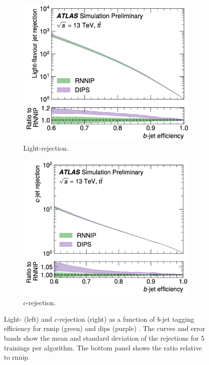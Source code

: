 \begin{figure}[h!]
  \centering
  \begin{subfigure}[b]{0.48\textwidth}
      \centering
      \includegraphics[width=\textwidth]{Images/FTAG/dipsrnnipL.png}
      \caption{Light-rejection.} 
      \label{fig:dipsrnnipPerfL}
  \end{subfigure}
  \hfill
  \begin{subfigure}[b]{0.48\textwidth}
      \centering
      \includegraphics[width=\textwidth]{Images/FTAG/dipsrnnipC.png}
      \caption{$c$-rejection.} 
      \label{fig:dipsrnnipPerfC}
  \end{subfigure}
  \caption{Light- (left) and $c$-rejection (right) as a function of $b$-jet tagging efficiency for \gls{rnnip} (green) and \gls{dips} (purple) \cite{ATL-PHYS-PUB-2020-014}. The curves and error bands show the mean and standard deviation of the rejections for 5 trainings per algorithm. The bottom panel shows the ratio relative to \gls{rnnip}.}
  \label{fig:dipsrnnipPerf}
\end{figure} 

